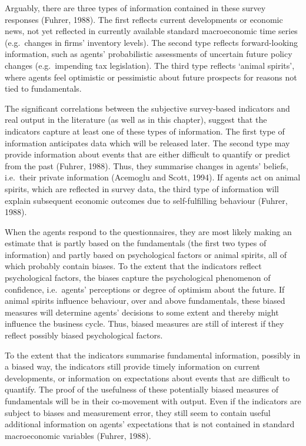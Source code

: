 \documentclass[11pt,]{article}
\begin{document}
Arguably, there are three types of information contained in these survey
responses (Fuhrer, 1988). The first reflects current developments or
economic news, not yet reflected in currently available standard
macroeconomic time series (e.g.~changes in firms' inventory levels). The
second type reflects forward-looking information, such as agents'
probabilistic assessments of uncertain future policy changes
(e.g.~impending tax legislation). The third type reflects `animal
spirits', where agents feel optimistic or pessimistic about future
prospects for reasons not tied to fundamentals.

The significant correlations between the subjective survey-based
indicators and real output in the literature (as well as in this
chapter), suggest that the indicators capture at least one of these
types of information. The first type of information anticipates data
which will be released later. The second type may provide information
about events that are either difficult to quantify or predict from the
past (Fuhrer, 1988). Thus, they summarise changes in agents' beliefs,
i.e.~their private information (Acemoglu and Scott, 1994). If agents act
on animal spirits, which are reflected in survey data, the third type of
information will explain subsequent economic outcomes due to
self-fulfilling behaviour (Fuhrer, 1988).

When the agents respond to the questionnaires, they are most likely
making an estimate that is partly based on the fundamentals (the first
two types of information) and partly based on psychological factors or
animal spirits, all of which probably contain biases. To the extent that
the indicators reflect psychological factors, the biases capture the
psychological phenomenon of confidence, i.e.~agents' perceptions or
degree of optimism about the future. If animal spirits influence
behaviour, over and above fundamentals, these biased measures will
determine agents' decisions to some extent and thereby might influence
the business cycle. Thus, biased measures are still of interest if they
reflect possibly biased psychological factors.

To the extent that the indicators summarise fundamental information,
possibly in a biased way, the indicators still provide timely
information on current developments, or information on expectations
about events that are difficult to quantify. The proof of the usefulness
of these potentially biased measures of fundamentals will be in their
co-movement with output. Even if the indicators are subject to biases
and measurement error, they still seem to contain useful additional
information on agents' expectations that is not contained in standard
macroeconomic variables (Fuhrer, 1988).
\end{document}
